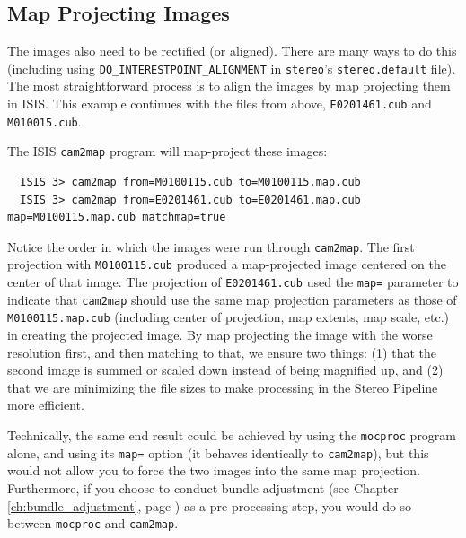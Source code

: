 \subsection{Map Projecting Images}

The images also need to be rectified (or aligned).  There are many
ways to do this (including using \texttt{DO\_INTERESTPOINT\_ALIGNMENT}
in \texttt{stereo}'s \texttt{stereo.default} file).  The most
straightforward process is to align the images by map projecting
them in \ac{ISIS}. This example continues with the files from above,
\texttt{E0201461.cub} and \texttt{M010015.cub}.

The \ac{ISIS} \texttt{cam2map} program will map-project these images:

\begin{verbatim}
  ISIS 3> cam2map from=M0100115.cub to=M0100115.map.cub
  ISIS 3> cam2map from=E0201461.cub to=E0201461.map.cub map=M0100115.map.cub matchmap=true
\end{verbatim}

Notice the order in which the images were run through
\texttt{cam2map}.  The first projection with \texttt{M0100115.cub}
produced a map-projected image centered on the center of that image.
The projection of \texttt{E0201461.cub} used the \texttt{map=}
parameter to indicate that \texttt{cam2map} should use the same map
projection parameters as those of \texttt{M0100115.map.cub} (including
center of projection, map extents, map scale, etc.) in creating the
projected image.  By map projecting the image with the worse
resolution first, and then matching to that, we ensure two things: (1)
that the second image is summed or scaled down instead of being
magnified up, and (2) that we are minimizing the file sizes to make
processing in the Stereo Pipeline more efficient.

Technically, the same end result could be achieved by using the
\texttt{mocproc} program alone, and using its \texttt{map=} option (it
behaves identically to \texttt{cam2map}), but this would not allow you
to force the two images into the same map projection.  Furthermore, if
you choose to conduct bundle adjustment (see Chapter
\ref{ch:bundle_adjustment}, page \pageref{ch:bundle_adjustment}) as a
pre-processing step, you would do so between \texttt{mocproc} and
\texttt{cam2map}.

